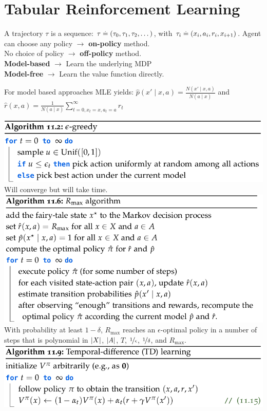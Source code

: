 \section{Tabular Reinforcement Learning}

A trajectory $\tau$ is a sequence: $\tau \overset{.}{=} (\tau_0, \tau_1, \tau_2, \dots)$, with $\tau_i \overset{.}{=} (x_i, a_i, r_i, x_{i+1})$.
Agent can choose any policy $\rightarrow$ \textbf{on-policy} method. \\
No choice of policy $\rightarrow$ \textbf{off-policy} method. \\
\textbf{Model-based} $\rightarrow$ Learn the underlying MDP \\
\textbf{Model-free} $\rightarrow$ Learn the value function directly.
\begin{framed}
    For model based approaches MLE yields: ${\hat{p}(x' \mid x, a) = \frac{N(x' \mid x, a)}{N(a \mid x)}}$ and \\ ${\hat{r}(x, a) = \frac{1}{N(a \mid x)} \sum_{t = 0, x_t = x,a_t = a}^\infty r_t}$
\end{framed}
\includegraphics[width=0.95\linewidth,trim={0 0 3cm 0}]{images/epsilon_greedy.png}
Will converge but will take time.
\includegraphics[width=0.95\linewidth, trim={0 0 3cm 0}]{images/R_max.png}
With probability at least $1-\delta$, $R_\mathrm{max}$ reaches an $\epsilon$-optimal policy in a number of steps that is polynomial in $\left| X \right|$, $\left| A \right|$, $T$, $\nicefrac{1}{\epsilon}$, $\nicefrac{1}{\delta}$, and $R_\mathrm{max}$.
\includegraphics[width=0.95\linewidth,trim={0 0 4cm 0}]{images/TD_learning.png}
